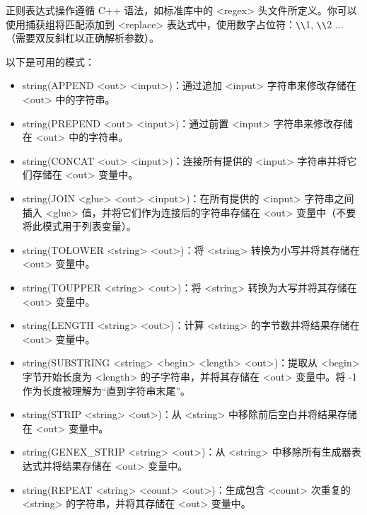 正则表达式操作遵循 C++ 语法，如标准库中的 <regex> 头文件所定义。你可以使用捕获组将匹配添加到 <replace> 表达式中，使用数字占位符：\verb|\\|1, \verb|\\|2 ... （需要双反斜杠以正确解析参数）。


以下是可用的模式：

\begin{itemize}
\item
string(APPEND <out> <input>)：通过追加 <input> 字符串来修改存储在 <out> 中的字符串。

\item
string(PREPEND <out> <input>)：通过前置 <input> 字符串来修改存储在 <out> 中的字符串。

\item
string(CONCAT <out> <input>)：连接所有提供的 <input> 字符串并将它们存储在 <out> 变量中。

\item
string(JOIN <glue> <out> <input>)：在所有提供的 <input> 字符串之间插入 <glue> 值，并将它们作为连接后的字符串存储在 <out> 变量中（不要将此模式用于列表变量）。

\item
string(TOLOWER <string> <out>)：将 <string> 转换为小写并将其存储在 <out> 变量中。

\item
string(TOUPPER <string> <out>)：将 <string> 转换为大写并将其存储在 <out> 变量中。

\item
string(LENGTH <string> <out>)：计算 <string> 的字节数并将结果存储在 <out> 变量中。

\item
string(SUBSTRING <string> <begin> <length> <out>)：提取从 <begin> 字节开始长度为 <length> 的子字符串，并将其存储在 <out> 变量中。将 -1 作为长度被理解为“直到字符串末尾”。

\item
string(STRIP <string> <out>)：从 <string> 中移除前后空白并将结果存储在 <out> 变量中。

\item
string(GENEX\_STRIP <string> <out>)：从 <string> 中移除所有生成器表达式并将结果存储在 <out> 变量中。

\item
string(REPEAT <string> <count> <out>)：生成包含 <count> 次重复的 <string> 的字符串，并将其存储在 <out> 变量中。
\end{itemize}


